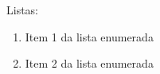 \documentclass[
	12pt,
	openright,
	oneside,
	a4paper,
	english,
	french,
	spanish,
	brazil
	]{abntex2}
\begin{document}
\frenchspacing
\imprimircapa
\imprimirfolhaderosto

Listas:
\begin{enumerate}
  \item Item 1 da lista enumerada
  \item Item 2 da lista enumerada
\end{enumerate}

\end{document}
